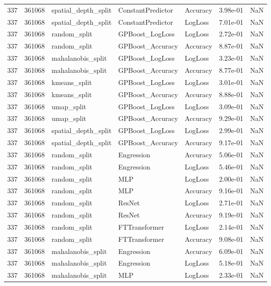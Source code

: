 \begin{tabular}{rrlllrr}
337 & 361068 & spatial\_depth\_split & ConstantPredictor & Accuracy & 3.98e-01 & NaN \\
337 & 361068 & spatial\_depth\_split & ConstantPredictor & LogLoss & 7.01e-01 & NaN \\
337 & 361068 & random\_split & GPBoost\_LogLoss & LogLoss & 2.72e-01 & NaN \\
337 & 361068 & random\_split & GPBoost\_Accuracy & Accuracy & 8.87e-01 & NaN \\
337 & 361068 & mahalanobis\_split & GPBoost\_LogLoss & LogLoss & 3.23e-01 & NaN \\
337 & 361068 & mahalanobis\_split & GPBoost\_Accuracy & Accuracy & 8.77e-01 & NaN \\
337 & 361068 & kmeans\_split & GPBoost\_LogLoss & LogLoss & 3.01e-01 & NaN \\
337 & 361068 & kmeans\_split & GPBoost\_Accuracy & Accuracy & 8.88e-01 & NaN \\
337 & 361068 & umap\_split & GPBoost\_LogLoss & LogLoss & 3.09e-01 & NaN \\
337 & 361068 & umap\_split & GPBoost\_Accuracy & Accuracy & 9.29e-01 & NaN \\
337 & 361068 & spatial\_depth\_split & GPBoost\_LogLoss & LogLoss & 2.99e-01 & NaN \\
337 & 361068 & spatial\_depth\_split & GPBoost\_Accuracy & Accuracy & 9.17e-01 & NaN \\
337 & 361068 & random\_split & Engression & Accuracy & 5.06e-01 & NaN \\
337 & 361068 & random\_split & Engression & LogLoss & 5.46e-01 & NaN \\
337 & 361068 & random\_split & MLP & LogLoss & 2.00e-01 & NaN \\
337 & 361068 & random\_split & MLP & Accuracy & 9.16e-01 & NaN \\
337 & 361068 & random\_split & ResNet & LogLoss & 2.71e-01 & NaN \\
337 & 361068 & random\_split & ResNet & Accuracy & 9.19e-01 & NaN \\
337 & 361068 & random\_split & FTTransformer & LogLoss & 2.14e-01 & NaN \\
337 & 361068 & random\_split & FTTransformer & Accuracy & 9.08e-01 & NaN \\
337 & 361068 & mahalanobis\_split & Engression & Accuracy & 6.09e-01 & NaN \\
337 & 361068 & mahalanobis\_split & Engression & LogLoss & 5.18e-01 & NaN \\
337 & 361068 & mahalanobis\_split & MLP & LogLoss & 2.33e-01 & NaN \\

\end{tabular}
